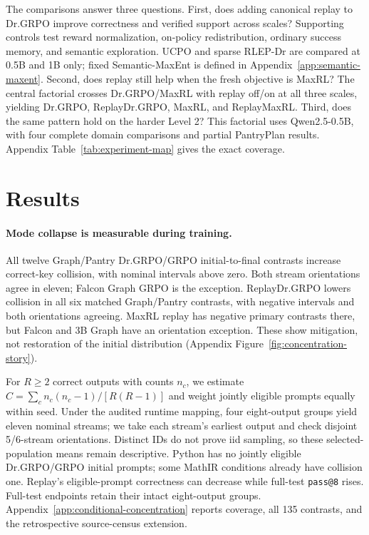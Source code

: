 \documentclass{article}
\newcommand{\1}{\mathbf 1}
\theoremstyle{remark}
\theoremstyle{definition}
\theoremstyle{plain}
\begin{document}
\label{sec:retention-design}
The comparisons answer three questions. First, does adding canonical replay
to Dr.GRPO improve correctness and verified support across scales? Supporting
controls test reward normalization, on-policy redistribution, ordinary success
memory, and semantic exploration. UCPO and sparse RLEP-Dr are compared at
0.5B and 1B only; fixed Semantic-MaxEnt is defined in
Appendix~\ref{app:semantic-maxent}. Second, does replay still help when the
fresh objective is MaxRL?
\label{sec:factorial-design}
The central factorial crosses Dr.GRPO/MaxRL with replay off/on at all three
scales, yielding Dr.GRPO, ReplayDr.GRPO, MaxRL, and ReplayMaxRL.
Third, does the same pattern hold on the harder Level 2? This factorial uses
Qwen2.5-0.5B, with four complete domain comparisons and partial PantryPlan
results. Appendix Table~\ref{tab:experiment-map} gives the exact coverage.

\section{Results}
\label{sec:results}

\paragraph{Mode collapse is measurable during training.}
All twelve Graph/Pantry Dr.GRPO/GRPO initial-to-final contrasts increase
correct-key collision, with nominal intervals above zero. Both stream
orientations agree in eleven; Falcon Graph GRPO is the exception.
ReplayDr.GRPO lowers collision in all six matched Graph/Pantry contrasts,
with negative intervals and both orientations agreeing. MaxRL replay has
negative primary contrasts there, but Falcon and 3B Graph have an orientation
exception. These show mitigation, not restoration of the initial distribution
(Appendix Figure~\ref{fig:concentration-story}).

For $R\ge2$ correct outputs with counts $n_c$, we estimate
$\widehat C=\sum_c n_c(n_c-1)/[R(R-1)]$ and weight jointly eligible prompts
equally within seed. Under the audited runtime mapping, four eight-output groups yield eleven
nominal streams; we take each stream's earliest output and check disjoint
5/6-stream orientations. Distinct IDs do not prove iid sampling, so
these selected-population means remain descriptive. Python has no jointly eligible Dr.GRPO/GRPO initial
prompts; some MathIR conditions already have collision
one. Replay's eligible-prompt correctness can decrease while full-test
\texttt{pass@8} rises. Full-test endpoints retain their intact eight-output
groups. Appendix~\ref{app:conditional-concentration} reports coverage, all
135 contrasts, and the retrospective source-census extension.
\end{document}
